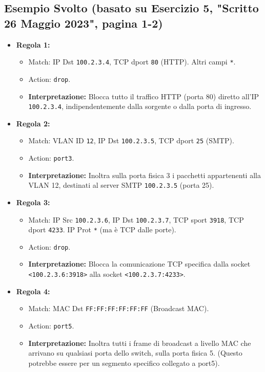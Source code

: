 \subsection{Esempio Svolto (basato su Esercizio 5, "Scritto 26 Maggio 2023", pagina 1-2)}
\begin{itemize}
    \item \textbf{Regola 1:}
    \begin{itemize}
        \item Match: IP Dst \texttt{100.2.3.4}, TCP dport \texttt{80} (HTTP). Altri campi \texttt{*}.
        \item Action: \texttt{drop}.
        \item \textbf{Interpretazione:} Blocca tutto il traffico HTTP (porta 80) diretto all'IP \texttt{100.2.3.4}, indipendentemente dalla sorgente o dalla porta di ingresso.
    \end{itemize}

    \item \textbf{Regola 2:}
    \begin{itemize}
        \item Match: VLAN ID \texttt{12}, IP Dst \texttt{100.2.3.5}, TCP dport \texttt{25} (SMTP).
        \item Action: \texttt{port3}.
        \item \textbf{Interpretazione:} Inoltra sulla porta fisica 3 i pacchetti appartenenti alla VLAN 12, destinati al server SMTP \texttt{100.2.3.5} (porta 25).
    \end{itemize}

    \item \textbf{Regola 3:}
    \begin{itemize}
        \item Match: IP Src \texttt{100.2.3.6}, IP Dst \texttt{100.2.3.7}, TCP sport \texttt{3918}, TCP dport \texttt{4233}. IP Prot \texttt{*} (ma è TCP dalle porte).
        \item Action: \texttt{drop}.
        \item \textbf{Interpretazione:} Blocca la comunicazione TCP specifica dalla socket \texttt{<100.2.3.6:3918>} alla socket \texttt{<100.2.3.7:4233>}.
    \end{itemize}

    \item \textbf{Regola 4:}
    \begin{itemize}
        \item Match: MAC Dst \texttt{FF:FF:FF:FF:FF:FF} (Broadcast MAC).
        \item Action: \texttt{port5}.
        \item \textbf{Interpretazione:} Inoltra tutti i frame di broadcast a livello MAC che arrivano su qualsiasi porta dello switch, sulla porta fisica 5. (Questo potrebbe essere per un segmento specifico collegato a port5).
    \end{itemize}
\end{itemize}


